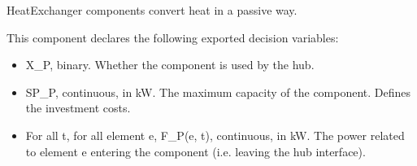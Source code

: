 \documentclass[letterpaper,10pt,english]{sphinxmanual}
\begin{document}
\begin{fulllineitems}
\label{\detokenize{generated/tamos.production.HeatExchanger:tamos.production.HeatExchanger}}
\pysigstartsignatures
{}
\pysigstopsignatures{}

\begin{fulllineitems}
\label{\detokenize{generated/tamos.production.HeatExchanger:tamos.production.HeatExchanger.__init__}}
\pysigstartsignatures
{}
\pysigstopsignatures
\sphinxAtStartPar
HeatExchanger components convert heat in a passive way.

\sphinxAtStartPar
This component declares the following exported decision variables:
\begin{itemize}
\item {} 
\sphinxAtStartPar
X\_P, binary.
Whether the component is used by the hub.

\item {} 
\sphinxAtStartPar
SP\_P, continuous, in kW.
The maximum capacity of the component. Defines the investment costs.

\item {} 
\sphinxAtStartPar
For all t, for all element e, F\_P(e, t), continuous, in kW.
The power related to element e entering the component (i.e. leaving the hub interface).


\end{itemize}
\end{fulllineitems}
\end{fulllineitems}
\end{document}

